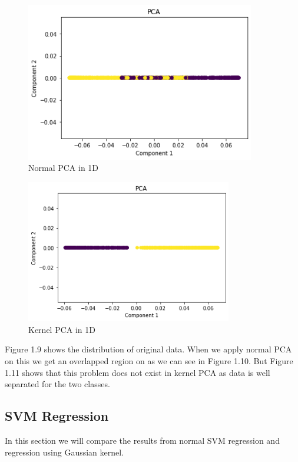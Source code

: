\documentclass[../main.tex]{subfiles}
\begin{document}
    \begin{figure}[htp]
    \centering
    \includegraphics[width=10cm]{H8.png}
    \caption{Normal PCA in 1D}
    \label{Normal PCA in 1D}
    \end{figure}
    
    \begin{figure}[htp]
    \centering
    \includegraphics[width=9cm]{H9.png}
    \caption{Kernel PCA in 1D}
    \label{Kernel PCA in 1D}

    \end{figure}

Figure 1.9 shows the distribution of original data. When we apply normal PCA on this we get an overlapped region on as we can see in Figure 1.10. But Figure 1.11 shows that this problem does not exist in kernel PCA as data is well separated for the two classes.
\newline
\newline
\newline

\subsection{SVM Regression}
In this section we will compare the results from normal SVM regression and regression using Gaussian kernel.
\end{document}
